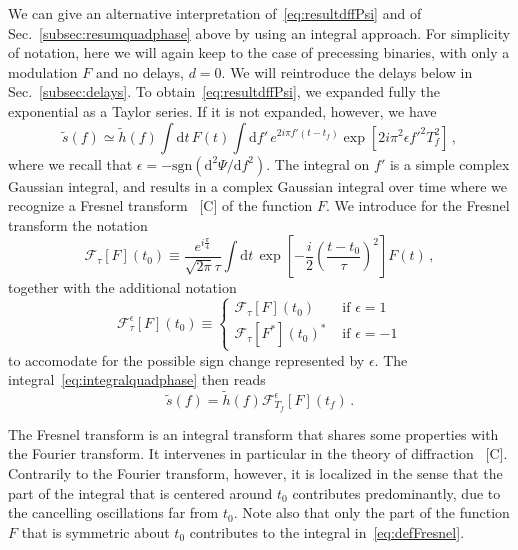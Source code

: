 \documentclass[aps,showpacs,twocolumn,
prd,superscriptaddress,nofootinbib]{revtex4-1}
\newcommand{\be}{\begin{equation}}
\newcommand{\ee}{\end{equation}}
\newcommand\ud{{\mathrm{d}}}
\newcommand\calF{{\mathcal{F}}}
\newcommand{\tf}{t_{f}}
\newcommand{\Tf}{T_{f}}
\newcommand{\SM}[1]{{\color{Red} #1}}
\begin{document}
We can give an alternative interpretation of~\eqref{eq:resultdffPsi} and of Sec.~\ref{subsec:resumquadphase} above by using an integral approach. For simplicity of notation, here we will again keep to the case of precessing binaries, with only a modulation $F$ and no delays, $d=0$. We will reintroduce the delays below in Sec.~\ref{subsec:delays}. To obtain~\eqref{eq:resultdffPsi}, we expanded fully the exponential as a Taylor series. If it is not expanded, however, we have
\be\label{eq:integralquadphase}
	\tilde{s}(f)	\simeq \tilde{h}(f) \int \ud t\, F(t) \int\ud f'\, e^{2i\pi f' (t-\tf)} \exp\left[ 2i\pi^{2} \epsilon{f'}^{2} \Tf^{2} \right] \,,
\ee
where we recall that $\epsilon = -\mathrm{sgn}(\ud ^{2} \Psi/\ud f^{2})$. The integral on $f'$ is a simple complex Gaussian integral, and results in a complex Gaussian integral over time where we recognize a Fresnel transform~\cite{} \SM{[C]} of the function $F$. We introduce for the Fresnel transform the notation
\be\label{eq:defFresnel}
	\calF_{\tau}[F](t_{0}) \equiv \frac{e^{i\frac{\pi}{4}}}{\sqrt{2\pi} \tau} \int \ud t \, \exp\left[ - \frac{i}{2} \left( \frac{t-t_{0}}{\tau} \right)^{2}\right] F(t) \,,
\ee
together with the additional notation
\be\label{eq:Fresnelsign}
	\calF^{\epsilon}_{\tau}[F](t_{0}) \equiv
\begin{cases}
	 \calF_{\tau}[F](t_{0}) &\text{ if } \epsilon=1 \\
	 \calF_{\tau}[F^{*}](t_{0})^{*} &\text{ if } \epsilon=-1
\end{cases}
\ee
to accomodate for the possible sign change represented by $\epsilon$. The integral~\eqref{eq:integralquadphase} then reads
\be\label{eq:resultFresnel}
	\tilde{s}(f) = \tilde{h}(f) \calF^{\epsilon}_{\Tf}[F](\tf) \,.
\ee

The Fresnel transform is an integral transform that shares some properties with the Fourier transform. It intervenes in particular in the theory of diffraction~\cite{} \SM{[C]}. Contrarily to the Fourier transform, however, it is localized in the sense that the part of the integral that is centered around $t_{0}$ contributes predominantly, due to the cancelling oscillations far from $t_{0}$. Note also that only the part of the function $F$ that is symmetric about $t_{0}$ contributes to the integral in~\eqref{eq:defFresnel}.
\end{document}
